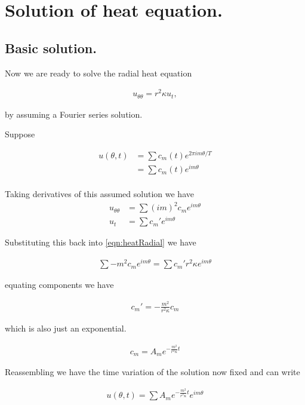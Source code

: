 \documentclass{article}
\begin{document}
\section{ Solution of heat equation. } 

\subsection{ Basic solution. }

Now we are ready to solve the radial heat equation

\begin{align}\label{eqn:heatRadial}
u_{\theta\theta} = r^2 \kappa u_t,
\end{align}

by assuming a Fourier series solution.

Suppose

\begin{align*}
u(\theta, t) 
&= \sum c_m(t) e^{2 \pi i m \theta / T} \\
&= \sum c_m(t) e^{i m \theta} \\
\end{align*}

Taking derivatives of this assumed solution we have
\begin{align*}
u_{\theta\theta} &= \sum (im)^2 c_m e^{i m \theta} \\
u_{t} &= \sum c_m' e^{i m \theta}
\end{align*}

Substituting this back into \ref{eqn:heatRadial} we have

\begin{align*}
\sum - m^2 c_m e^{ i m \theta} = \sum c_m' r^2 \kappa e^{i m \theta}
\end{align*}

equating components we have 

\begin{align*}
c_m' = - \frac{m^2}{ r^2 \kappa } c_m 
\end{align*}

which is also just an exponential.

\begin{align*}
c_m = A_m e^{- \frac{m^2}{ r^2 \kappa } t }
\end{align*}

Reassembling we have the time variation of the solution now fixed and can write

\begin{align}
u(\theta, t) = \sum A_m e^{- \frac{m^2}{ r^2 \kappa } t } e^{i m \theta}
\end{align}
\end{document}
